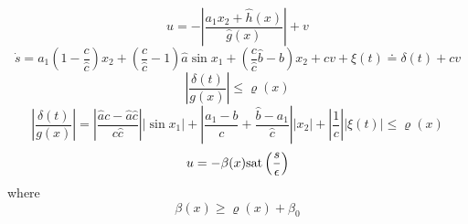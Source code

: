 \begin{equation}
        u = -\left \vert \frac{a_1 x_2 + \hat{h}(x)}{\hat{g}(x)} \right\vert + v
\end{equation}
\begin{equation}
        \dot{s} = a_1\left(1 - \frac{c}{\hat{c}}\right) x_2 + \left(\frac{c}{\hat{c}} - 1\right)\hat{a} \sin x_1 + \left(\frac{c}{\hat{c}}\hat{b} - b\right) x_2 + cv + \xi(t) \doteq \delta(t) + cv
\end{equation}
\begin{equation}
        \left \vert \frac{\delta(t)}{g(x)} \right\vert \leq \varrho(x)
\end{equation}
\begin{equation}
        \left \vert \frac{\delta(t)}{g(x)} \right\vert = \left \vert \frac{\hat{a}c-\hat{a}\hat{c}}{c\hat{c}} \right \vert \vert \sin x_1 \vert + \left \vert \frac{a_1 - b}{c} + \frac{\hat{b} - a_1}{\hat{c}} \right \vert \vert x_2 \vert + \left\vert \frac{1}{c}\right\vert \left\vert \xi(t) \right\vert \leq \varrho(x)
\end{equation}
\begin{equation}
        u = -\beta(x)\mathrm{sat}\left(\frac{s}{\epsilon}\right)
\end{equation}
where
\begin{equation}
        \beta(x) \geq \varrho(x) + \beta_0
\end{equation}


